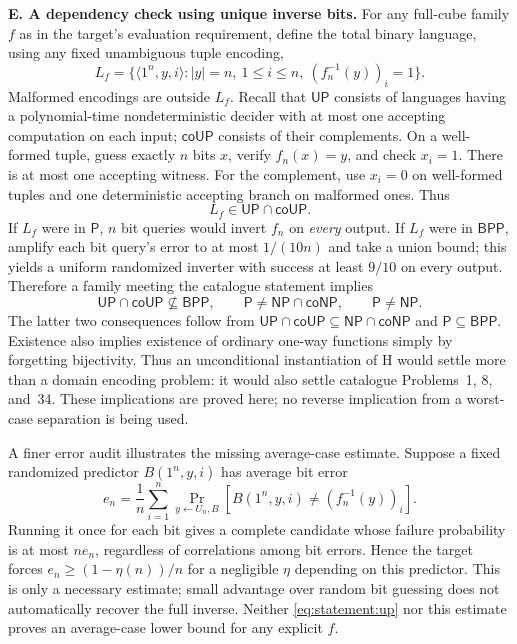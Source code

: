 \documentclass[11pt,a4paper]{article}
\numberwithin{equation}{section}
\begin{document}
\medskip{}
\textbf{E. A dependency check using unique inverse bits.}
For any full-cube family $f$ as in the target's evaluation requirement,
define the total binary language, using any fixed unambiguous tuple
encoding,
\[
 L_f=\{\langle1^n,y,i\rangle: |y|=n,\ 1\le i\le n,
                         \ (f_n^{-1}(y))_i=1\}.
\]
Malformed encodings are outside $L_f$. Recall that $\mathsf{UP}$ consists
of languages having a polynomial-time nondeterministic decider with at
most one accepting computation on each input; $\mathsf{coUP}$ consists
of their complements.
On a well-formed tuple, guess exactly $n$ bits $x$, verify $f_n(x)=y$,
and check $x_i=1$. There is at most one accepting witness. For the
complement, use $x_i=0$ on well-formed tuples and one deterministic
accepting branch on malformed ones. Thus
\begin{equation}\label{eq:statement:up}
 L_f\in\mathsf{UP}\cap\mathsf{coUP}.
\end{equation}
If $L_f$ were in $\mathsf P$, $n$ bit queries would invert $f_n$ on
\emph{every} output. If $L_f$ were in $\mathsf{BPP}$, amplify each bit
query's error to at most $1/(10n)$ and take a union bound; this yields a
uniform randomized inverter with success at least $9/10$ on every
output. Therefore a family meeting the catalogue statement implies
\[
 \mathsf{UP}\cap\mathsf{coUP}\not\subseteq\mathsf{BPP},
 \qquad
 \mathsf P\ne\mathsf{NP}\cap\mathsf{coNP},
 \qquad \mathsf P\ne\mathsf{NP}.
\]
The latter two consequences follow from
$\mathsf{UP}\cap\mathsf{coUP}\subseteq\mathsf{NP}\cap\mathsf{coNP}$
and $\mathsf P\subseteq\mathsf{BPP}$. Existence also implies existence
of ordinary one-way functions simply by forgetting bijectivity.
Thus an unconditional instantiation of H would settle more than a domain
encoding problem: it would also settle catalogue Problems~1, 8, and~34.
These implications are proved here; no reverse implication from a
worst-case separation is being used.

A finer error audit illustrates the missing average-case estimate.
Suppose a fixed randomized predictor $B(1^n,y,i)$ has average bit error
\[
 e_n=\frac1n\sum_{i=1}^n
      \Pr_{y\leftarrow U_n,B}[B(1^n,y,i)\ne(f_n^{-1}(y))_i].
\]
Running it once for each bit gives a complete candidate whose failure
probability is at most $n e_n$, regardless of correlations among bit
errors. Hence the target forces
$e_n\ge(1-\eta(n))/n$ for a negligible $\eta$ depending on this
predictor. This is only a necessary estimate; small advantage over
random bit guessing does not automatically recover the full inverse.
Neither \eqref{eq:statement:up} nor this estimate proves an average-case lower
bound for any explicit $f$.
\end{document}
